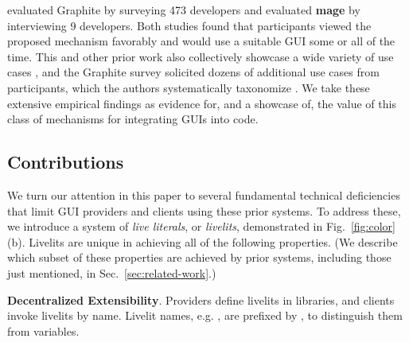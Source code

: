 \citet{Graphite} evaluated Graphite by surveying 473 developers 
and \citet{DBLP:conf/uist/KeryRHMWP20} evaluated \textbf{mage} by interviewing 9 developers.
Both studies found that
participants viewed the proposed mechanism favorably and 
would use a suitable GUI some or all of the time.
This and other prior work also collectively showcase a wide variety of use cases \cite{Graphite,DBLP:conf/uist/KeryRHMWP20,interactive-visual-syntax}, 
and the Graphite survey solicited dozens of additional use cases from participants,
which the authors systematically taxonomize \cite{Graphite}. 
We take these extensive empirical findings   
as evidence for, and a showcase of, 
the value of this class of mechanisms for integrating GUIs into code.

\subsection{Contributions}
\label{sec:contributions}
We turn our attention in this paper to several fundamental technical
deficiencies that limit GUI providers and clients using these prior systems.
To address these, 
we introduce a system of \emph{live literals}, or \emph{livelits}, 
demonstrated in Fig.~\ref{fig:color}(b). 
Livelits are unique in achieving all of the following properties.
(We describe which subset of these properties 
are achieved by prior systems,
including those just mentioned, 
in Sec.~\ref{sec:related-work}.)

\newcommand{\llproperty}[1]{\vspace{5px}\noindent\textbf{#1}.}

\llproperty{Decentralized Extensibility}
    Providers define livelits in libraries, and 
    clients invoke livelits by name. Livelit names, e.g. ,  are prefixed by \li{\$},    
    to distinguish them from variables.
 
